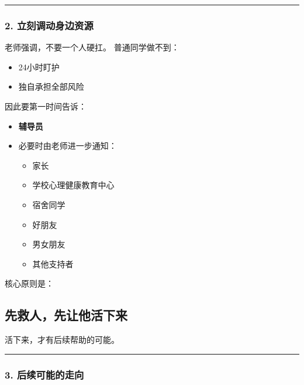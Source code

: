 \documentclass[
  chinese,
  9pt,
  a4paper,
]{ctexart}
\providecommand{\tightlist}{%
  \setlength{\itemsep}{0pt}\setlength{\parskip}{0pt}}
\begin{document}
\begin{center}\rule{0.5\linewidth}{0.5pt}\end{center}

\subsubsection{2.
立刻调动身边资源}\label{ux7acbux523bux8c03ux52a8ux8eabux8fb9ux8d44ux6e90}

老师强调，不要一个人硬扛。 普通同学做不到：

\begin{itemize}
\tightlist
\item
  24小时盯护
\item
  独自承担全部风险
\end{itemize}

因此要第一时间告诉：

\begin{itemize}
\item
  \textbf{辅导员}
\item
  必要时由老师进一步通知：

  \begin{itemize}
  \tightlist
  \item
    家长
  \item
    学校心理健康教育中心
  \item
    宿舍同学
  \item
    好朋友
  \item
    男女朋友
  \item
    其他支持者
  \end{itemize}
\end{itemize}

核心原则是：

\subsection{先救人，先让他活下来}\label{ux5148ux6551ux4ebaux5148ux8ba9ux4ed6ux6d3bux4e0bux6765}

活下来，才有后续帮助的可能。

\begin{center}\rule{0.5\linewidth}{0.5pt}\end{center}

\subsubsection{3.
后续可能的走向}\label{ux540eux7eedux53efux80fdux7684ux8d70ux5411}
\end{document}
